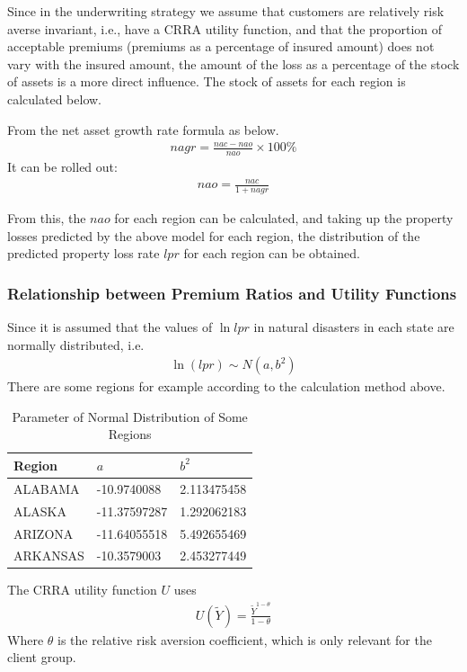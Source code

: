 \documentclass[12pt]{article}  %
\begin{document}
Since in the underwriting strategy we assume that customers are relatively risk averse invariant, i.e., have a CRRA utility function, and that the proportion of acceptable premiums (premiums as a percentage of insured amount) does not vary with the insured amount, the amount of the loss as a percentage of the stock of assets is a more direct influence. The stock of assets for each region is calculated below.

From the net asset growth rate formula as below.
\begin{align*}
    nagr= \frac{nac-nao}{nao} \times 100\%
\end{align*}
It can be rolled out:
\begin{align*}
    nao= \frac{nac}{1+nagr}
\end{align*}

From this, the $nao$ for each region can be calculated, and taking up the property losses predicted by the above model for each region, the distribution of the predicted property loss rate $lpr$ for each region can be obtained.

\subsubsection{Relationship between Premium Ratios and Utility Functions}
Since it is assumed that the values of $\ln lpr$ in natural disasters in each state are normally distributed, i.e.
\begin{align*}
    \ln (lpr) \sim N(a,b^2)
\end{align*}
There are some regions for example according to the calculation method above.


\begin{table}[!ht]
    \centering
    \begin{tabular}{|l|l|l|}
    \hline
        Region & $a$ & $b^2$ \\ \hline
        ALABAMA & -10.9740088 & 2.113475458 \\ \hline
        ALASKA & -11.37597287 & 1.292062183 \\ \hline
        ARIZONA & -11.64055518 & 5.492655469 \\ \hline
        ARKANSAS & -10.3579003 & 2.453277449 \\ \hline
    \end{tabular}
    \caption{Parameter of Normal Distribution of Some Regions}
\end{table}

The CRRA utility function $U$ uses
\begin{align*}
    U( \widetilde{Y} )= \frac{\widetilde{Y}^{1-\theta}}{1-\theta}
\end{align*}
Where $\theta$ is the relative risk aversion coefficient, which is only relevant for the client group.
\end{document}
